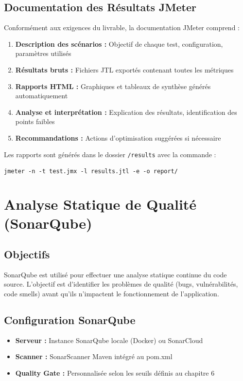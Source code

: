\documentclass[12pt,a4paper]{report}
\begin{document}
\subsection{Documentation des Résultats JMeter}

Conformément aux exigences du livrable, la documentation JMeter comprend :

\begin{enumerate}
    \item \textbf{Description des scénarios :} Objectif de chaque test, configuration, paramètres utilisés
    
    \item \textbf{Résultats bruts :} Fichiers JTL exportés contenant toutes les métriques
    
    \item \textbf{Rapports HTML :} Graphiques et tableaux de synthèse générés automatiquement
    
    \item \textbf{Analyse et interprétation :} Explication des résultats, identification des points faibles
    
    \item \textbf{Recommandations :} Actions d'optimisation suggérées si nécessaire
\end{enumerate}

Les rapports sont générés dans le dossier \texttt{/results} avec la commande :

\texttt{jmeter -n -t test.jmx -l results.jtl -e -o report/}

\section{Analyse Statique de Qualité (SonarQube)}

\subsection{Objectifs}

SonarQube est utilisé pour effectuer une analyse statique continue du code source. L'objectif est d'identifier les problèmes de qualité (bugs, vulnérabilités, code smells) avant qu'ils n'impactent le fonctionnement de l'application.

\subsection{Configuration SonarQube}

\begin{itemize}
    \item \textbf{Serveur :} Instance SonarQube locale (Docker) ou SonarCloud
    \item \textbf{Scanner :} SonarScanner Maven intégré au pom.xml
    \item \textbf{Quality Gate :} Personnalisée selon les seuils définis au chapitre 6
\end{itemize}
\end{document}
